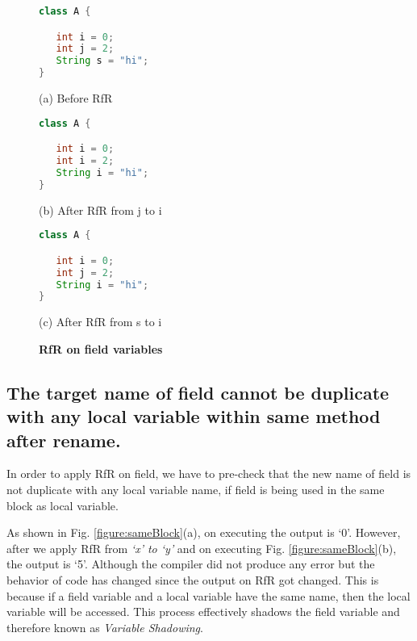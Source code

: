 \begin{figure}[th]
\centering	
\begin{minipage}[t]{0.45\linewidth}
\begin{lstlisting}[language=java, basicstyle=\scriptsize\ttfamily,frame=single]
class A {

   int i = 0;
   int j = 2;
   String s = "hi";
}

\end{lstlisting}
\centering(a) Before RfR
\end{minipage}
\hfill
\begin{minipage}[t]{0.45\linewidth}
\begin{lstlisting}[language=java, basicstyle=\scriptsize\ttfamily,frame=single]
class A {

   int i = 0;
   int i = 2;
   String i = "hi";
}
\end{lstlisting}
\centering(b) After RfR from j to i
\end{minipage}

\centering
\begin{minipage}[t]{0.45\linewidth}
\begin{lstlisting}[language=java, basicstyle=\scriptsize\ttfamily,frame=single]
class A {

   int i = 0;
   int j = 2;
   String i = "hi";
}
\end{lstlisting}
\centering(c) After RfR from s to i
\end{minipage}
\caption{\textbf{RfR on field variables}}
\label{figure:field}
\end{figure}


\subsection{The target name of field cannot be duplicate with any local variable within same method after rename.}
In order to apply RfR on field, we have to pre-check that the new name of field is not duplicate with any local variable name, if field is being used in the same block as local variable. 

As shown in Fig. \ref{figure:sameBlock}(a), on executing the output is `0'. However,  after we apply RfR from \emph{`x' to `y'} and on executing Fig. \ref{figure:sameBlock}(b), the output is `5'. Although the compiler did not produce any error but the behavior of code has changed since the output on RfR got changed. This is because if a field variable and a local variable have the same name, then the local variable will be accessed. This process effectively shadows the field variable and therefore known as \textit{Variable Shadowing}. 
 

